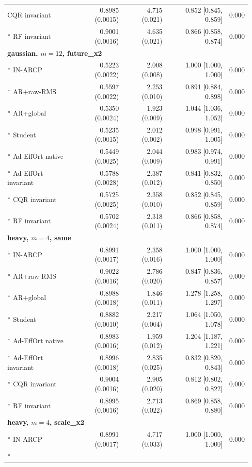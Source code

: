\begin{longtable}{lrrrr}
CQR invariant & 0.8985 (0.0015) & 4.715 (0.021) & 0.852 [0.845, 0.859] & 0.000 \\*
RF invariant & 0.9001 (0.0016) & 4.635 (0.021) & 0.866 [0.858, 0.874] & 0.000 \\
\midrule
\multicolumn{5}{l}{\textbf{gaussian, $m=12$, future\_x2}}\\*
IN-ARCP & 0.5223 (0.0022) & 2.008 (0.008) & 1.000 [1.000, 1.000] & 0.000 \\*
AR+raw-RMS & 0.5597 (0.0022) & 2.253 (0.010) & 0.891 [0.884, 0.898] & 0.000 \\*
AR+global & 0.5350 (0.0024) & 1.923 (0.009) & 1.044 [1.036, 1.052] & 0.000 \\*
Student & 0.5235 (0.0015) & 2.012 (0.002) & 0.998 [0.991, 1.005] & 0.000 \\*
Ad-EffOrt native & 0.5449 (0.0025) & 2.044 (0.009) & 0.983 [0.974, 0.991] & 0.000 \\*
Ad-EffOrt invariant & 0.5788 (0.0028) & 2.387 (0.012) & 0.841 [0.832, 0.850] & 0.000 \\*
CQR invariant & 0.5725 (0.0025) & 2.358 (0.010) & 0.852 [0.845, 0.859] & 0.000 \\*
RF invariant & 0.5702 (0.0024) & 2.318 (0.011) & 0.866 [0.858, 0.874] & 0.000 \\
\midrule
\multicolumn{5}{l}{\textbf{heavy, $m=4$, same}}\\*
IN-ARCP & 0.8991 (0.0017) & 2.358 (0.016) & 1.000 [1.000, 1.000] & 0.000 \\*
AR+raw-RMS & 0.9022 (0.0016) & 2.786 (0.020) & 0.847 [0.836, 0.857] & 0.000 \\*
AR+global & 0.8988 (0.0018) & 1.846 (0.011) & 1.278 [1.258, 1.297] & 0.000 \\*
Student & 0.8882 (0.0010) & 2.217 (0.004) & 1.064 [1.050, 1.078] & 0.000 \\*
Ad-EffOrt native & 0.8983 (0.0016) & 1.959 (0.012) & 1.204 [1.187, 1.221] & 0.000 \\*
Ad-EffOrt invariant & 0.8996 (0.0018) & 2.835 (0.025) & 0.832 [0.820, 0.843] & 0.000 \\*
CQR invariant & 0.9004 (0.0016) & 2.905 (0.020) & 0.812 [0.802, 0.822] & 0.000 \\*
RF invariant & 0.8995 (0.0016) & 2.713 (0.022) & 0.869 [0.858, 0.880] & 0.000 \\
\midrule
\multicolumn{5}{l}{\textbf{heavy, $m=4$, scale\_x2}}\\*
IN-ARCP & 0.8991 (0.0017) & 4.717 (0.033) & 1.000 [1.000, 1.000] & 0.000 \\*

\end{longtable}
